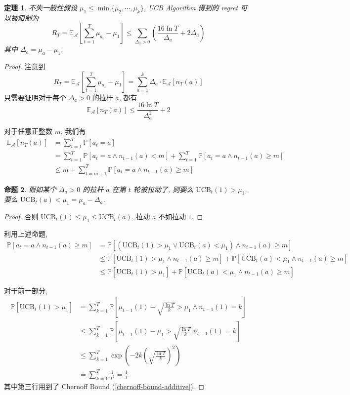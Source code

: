 \documentclass[8pt]{article}
\theoremstyle{compact}
\newtheorem{theorem}{定理}[section]
\newtheorem{proposition}[theorem]{命题}
\def\le{\leqslant}
\def\ge{\geqslant}
\def\P#1{\mathbb{P}\left[{#1}\right]}
\begin{document}
\begin{theorem}
	不失一般性假设 $\mu_1 \le \min\{\mu_2, \cdots, \mu_k\}$, UCB Algorithm 得到的 regret 可以被限制为
	$$R_T = \mathbb E_{\mathcal A}\left[\sum_{t=1}^T\mu_{a_t} - \mu_1\right] \le \sum_{\Delta_a > 0}\left(\frac{16\ln T}{\Delta_a} + 2\Delta_a\right)$$
	其中 $\Delta_a = \mu_a - \mu_1$.
\end{theorem}
\begin{proof}
	注意到 $$R_T = \mathbb E_{\mathcal A}\left[\sum_{t=1}^T\mu_{a_t} - \mu_1\right] = \sum_{a=1}^{k}\Delta_a \cdot \mathbb E_{\mathcal A}[n_T(a)]$$ 只需要证明对于每个 $\Delta_a > 0$ 的拉杆 $a$, 都有 $$\mathbb E_{\mathcal A}[n_T(a)] \le \frac{16\ln T}{\Delta_a^2} + 2$$

	对于任意正整数 $m$, 我们有 \begin{equation*}
		\begin{split}
			\mathbb E_{\mathcal A}[n_T(a)] &= \sum_{t=1}^T \P{a_t = a} \\
			&= \sum_{t=1}^T \P{a_t = a \wedge n_{t-1}(a) < m} + \sum_{t=1}^T \P{a_t = a \wedge n_{t-1}(a) \ge m}\\
			&\le m + \sum_{t=m+1}^T \P{a_t = a \wedge n_{t-1}(a) \ge m}
		\end{split}
	\end{equation*}

	\begin{proposition}
		假如某个 $\Delta_a > 0$ 的拉杆 $a$ 在第 $t$ 轮被拉动了, 则要么 $\text{UCB}_t(1) > \mu_1$, 要么 $\text{UCB}_t(a) < \mu_1 = \mu_a - \Delta_a$.
	\end{proposition}
	\begin{proof}
		否则 $\text{UCB}_t(1) \le \mu_1 \le \text{UCB}_t(a)$, 拉动 $a$ 不如拉动 $1$.
	\end{proof}

	利用上述命题, \begin{equation*}
		\begin{split}
			\P{a_t = a \wedge n_{t-1}(a) \ge m} &= \P{\left(\text{UCB}_t(1) > \mu_1 \vee \text{UCB}_t(a) < \mu_1\right) \wedge n_{t-1}(a) \ge m}\\
			&\le \P{\text{UCB}_t(1) > \mu_1 \wedge n_{t-1}(a) \ge m} + \P{\text{UCB}_t(a) < \mu_1 \wedge n_{t-1}(a) \ge m}\\
			&\le \P{\text{UCB}_t(1) > \mu_1} + \P{\text{UCB}_t(a) < \mu_1 \wedge n_{t-1}(a) \ge m}
		\end{split}
	\end{equation*}

	对于前一部分, \begin{equation*}
		\begin{split}
			\P{\text{UCB}_t(1) > \mu_1} &= \sum_{k=1}^T \P{\mu_{t-1}(1) - \sqrt{\frac{\ln T}{k}} > \mu_1 \wedge n_{t-1}(1) = k} \\
			&\le \sum_{k=1}^T \P{\mu_{t-1}(1) - \mu_1 > \sqrt{\frac{\ln T}{k}} \bigg| n_{t-1}(1) = k}\\
			&\le \sum_{k=1}^T \exp\left(-2k\left(\sqrt{\frac{\ln T}{k}}\right)^2\right) \\
			&= \sum_{k=1}^T \frac{1}{T^2} = \frac 1T
		\end{split}
	\end{equation*}
	其中第三行用到了 Chernoff Bound (\cref{chernoff-bound-additive}).
	

\end{proof}
\end{document}
